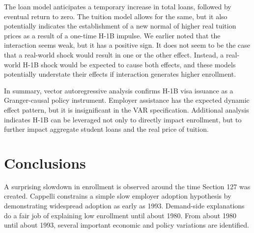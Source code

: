 \documentclass[review]{elsarticle}
\begin{document}
The loan model anticipates a temporary increase in total loans,
followed by eventual return to zero.
The tuition model allows for the same,
but it also potentially indicates the establishment of a new normal
of higher real tuition prices as a result of a one-time H-1B impulse.
We earlier noted that the interaction seems weak, but it has a positive sign.
It does not seem to be the case that a real-world shock would result in one or the other effect.
Instead, a real-world H-1B shock would be expected to cause both effects,
and these models potentially understate their effects if interaction generates higher enrollment.

In summary, vector autoregressive analysis confirms H-1B visa issuance as a Granger-causal policy instrument.
Employer assistance has the expected dynamic effect pattern, but it is insignificant in the VAR specification.
Additional analysis indicates H-1B can be leveraged not only to directly impact enrollment,
but to further impact aggregate student loans and the real price of tuition.

\section{Conclusions}

A surprising slowdown in enrollment is observed around the time Section 127 was created.
Cappelli constrains a simple slow employer adoption hypothesis by demonstrating widespread adoption as early as 1993.
Demand-side explanations do a fair job of explaining low enrollment until about 1980.
From about 1980 until about 1993, several important economic and policy variations are identified.



%
%
\end{document}
